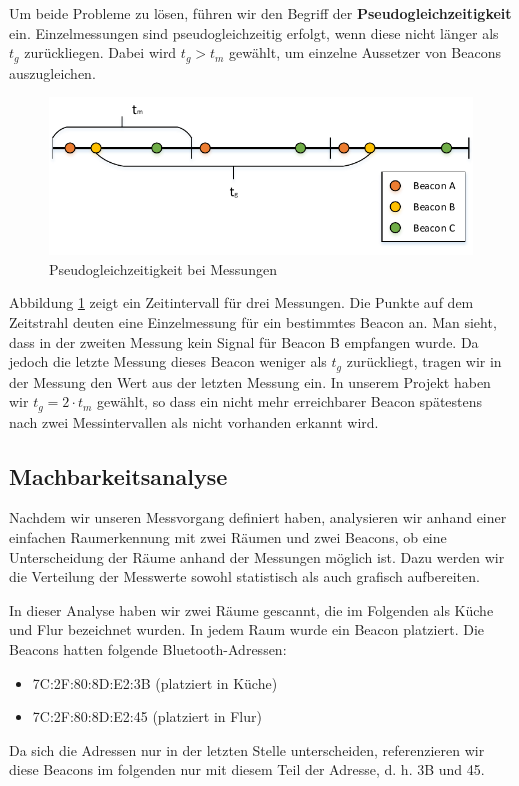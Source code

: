Um beide Probleme zu lösen, führen wir den Begriff der \textbf{Pseudogleichzeitigkeit} ein.
Einzelmessungen sind pseudogleichzeitig erfolgt, wenn diese nicht länger als 
$t_g$ zurückliegen. Dabei wird $t_g > t_m$ gewählt, um einzelne Aussetzer von Beacons
auszugleichen.

\begin{figure}[tbh]
\centering
\includegraphics[width=1.0\linewidth]{Bilder/Lok-Messung}
\caption{Pseudogleichzeitigkeit bei Messungen}
\label{fig:Lok-Messung}
\end{figure}

Abbildung \ref{fig:Lok-Messung} zeigt ein Zeitintervall für drei Messungen. Die
Punkte auf dem Zeitstrahl deuten eine Einzelmessung für ein bestimmtes Beacon
an.
Man sieht, dass in der zweiten Messung kein Signal für Beacon B empfangen wurde.
Da jedoch die letzte Messung dieses Beacon weniger als $t_g$ zurückliegt, tragen
wir in der Messung den Wert aus der letzten Messung ein.
In unserem Projekt haben wir $t_g = 2 \cdot t_m$ gewählt, so dass ein nicht mehr
erreichbarer Beacon spätestens nach zwei Messintervallen als nicht vorhanden
erkannt wird.

\subsection{Machbarkeitsanalyse}

Nachdem wir unseren Messvorgang definiert haben, analysieren wir anhand
einer einfachen Raumerkennung mit zwei Räumen und zwei Beacons, ob eine
Unterscheidung der Räume anhand der Messungen möglich ist.
Dazu werden wir die Verteilung der Messwerte sowohl statistisch als
auch grafisch aufbereiten.

In dieser Analyse haben wir zwei Räume gescannt, die im Folgenden als
Küche und Flur bezeichnet wurden. In jedem Raum wurde ein Beacon platziert.
Die Beacons hatten folgende Bluetooth-Adressen:
\begin{itemize}
	\item 7C:2F:80:8D:E2:3B (platziert in Küche)
	\item 7C:2F:80:8D:E2:45 (platziert in Flur)
\end{itemize}
Da sich die Adressen nur in der letzten Stelle unterscheiden, referenzieren
wir diese Beacons im folgenden nur mit diesem Teil der Adresse, d. h.
3B und 45.


